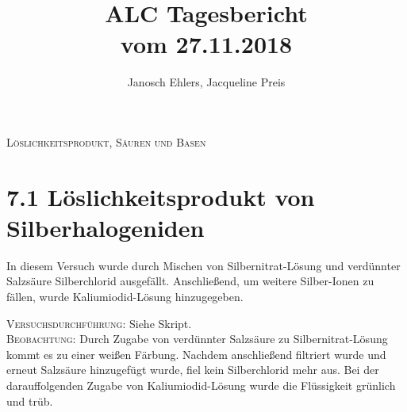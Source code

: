 \documentclass[11pt, a4paper]{article}
\begin{document}
\title{ALC Tagesbericht\\ vom 27.11.2018}
\author{Janosch Ehlers, Jacqueline Preis}
\maketitle

	\begin{center}
	\textsc{Löslichkeitsprodukt, Säuren und Basen}
	\end{center}

\section{7.1 Löslichkeitsprodukt von Silberhalogeniden}

In diesem Versuch wurde durch Mischen von Silbernitrat-Lösung und verdünnter Salzsäure Silberchlorid ausgefällt. Anschließend, um weitere Silber-Ionen zu fällen, wurde Kaliumiodid-Lösung hinzugegeben. 

\textsc{Versuchsdurchführung:} Siehe Skript.\\

\textsc{Beobachtung:}\hspace{5mm} Durch Zugabe von verdünnter Salzsäure zu Silbernitrat-Lösung kommt es zu einer weißen Färbung. Nachdem anschließend filtriert wurde und erneut Salzsäure hinzugefügt wurde, fiel kein Silberchlorid mehr aus. Bei der darauffolgenden Zugabe von Kaliumiodid-Lösung wurde die Flüssigkeit grünlich und trüb.\\
\end{document}
